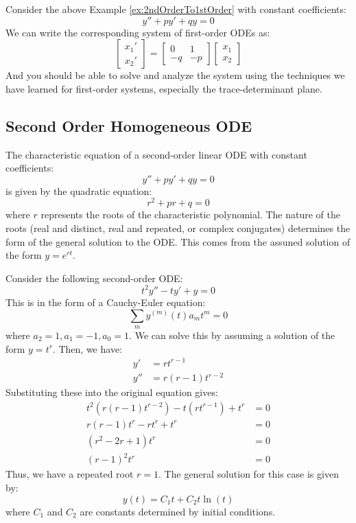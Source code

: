 \documentclass[11pt]{article}
\begin{document}
\begin{example}
    Consider the above Example \ref{ex:2ndOrderTo1stOrder} with constant coefficients:
    $$y'' + p y' + q y = 0
    $$
    We can write the corresponding system of first-order ODEs as:
    $$\begin{bmatrix}
    x_1' \\ x_2'
    \end{bmatrix} = \begin{bmatrix}
    0 & 1 \\
    -q & -p
    \end{bmatrix} \begin{bmatrix}
    x_1 \\ x_2
    \end{bmatrix}
    $$
    And you should be able to solve and analyze the system using the techniques we have learned for first-order systems, especially the trace-determinant plane.

\end{example}
\subsection{Second Order Homogeneous ODE}
\begin{definition}
    The characteristic equation of a second-order linear ODE with constant coefficients:
    $$y'' + p y' + q y = 0$$
    is given by the quadratic equation:
    \begin{equation}
    r^2 + pr + q = 0
    \end{equation}
    where \( r \) represents the roots of the characteristic polynomial. The nature of the roots (real and distinct, real and repeated, or complex conjugates) determines the form of the general solution to the ODE. This comes from the assuned solution of the form \( y = e^{rt} \).
\end{definition}

\begin{example}
    Consider the following second-order ODE:
    $$t^2 y'' - t y' + y = 0$$
    This is in the form of a Cauchy-Euler equation:
    $$
    \sum_m y^{(m)}(t) a_m t^m = 0
    $$
    where \( a_2 = 1, a_1 = -1, a_0 = 1 \). We can solve this by assuming a solution of the form \( y = t^r \). Then, we have:
    \begin{align*}
        y' &= r t^{r-1} \\
        y'' &= r(r-1) t^{r-2}
    \end{align*}
    Substituting these into the original equation gives:
    \begin{align*}
        t^2 (r(r-1) t^{r-2}) - t (r t^{r-1}) + t^r &= 0 \\
        r(r-1) t^r - r t^r + t^r &= 0 \\
        (r^2 - 2r + 1) t^r &= 0 \\
        (r - 1)^2 t^r &= 0
    \end{align*}
    Thus, we have a repeated root \( r = 1 \). The general solution for this case is given by:
    $$y(t) = C_1 t + C_2 t \ln(t)$$
    where \( C_1 \) and \( C_2 \) are constants determined by initial conditions.
\end{example}
\end{document}
